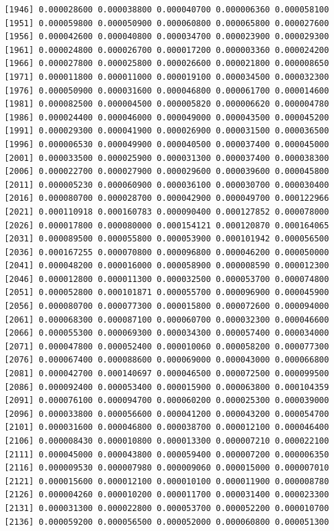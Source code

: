 \documentclass[]{article}
\begin{document}
\begin{verbatim}
 [1946] 0.000028600 0.000038800 0.000040700 0.000006360 0.000058100
 [1951] 0.000059800 0.000050900 0.000060800 0.000065800 0.000027600
 [1956] 0.000042600 0.000040800 0.000034700 0.000023900 0.000029300
 [1961] 0.000024800 0.000026700 0.000017200 0.000003360 0.000024200
 [1966] 0.000027800 0.000025800 0.000026600 0.000021800 0.000008650
 [1971] 0.000011800 0.000011000 0.000019100 0.000034500 0.000032300
 [1976] 0.000050900 0.000031600 0.000046800 0.000061700 0.000014600
 [1981] 0.000082500 0.000004500 0.000005820 0.000006620 0.000004780
 [1986] 0.000024400 0.000046000 0.000049000 0.000043500 0.000045200
 [1991] 0.000029300 0.000041900 0.000026900 0.000031500 0.000036500
 [1996] 0.000006530 0.000049900 0.000040500 0.000037400 0.000045000
 [2001] 0.000033500 0.000025900 0.000031300 0.000037400 0.000038300
 [2006] 0.000022700 0.000027900 0.000029600 0.000039600 0.000045800
 [2011] 0.000005230 0.000060900 0.000036100 0.000030700 0.000030400
 [2016] 0.000080700 0.000028700 0.000042900 0.000049700 0.000122966
 [2021] 0.000110918 0.000160783 0.000090400 0.000127852 0.000078000
 [2026] 0.000017800 0.000080000 0.000154121 0.000120870 0.000164065
 [2031] 0.000089500 0.000055800 0.000053900 0.000101942 0.000056500
 [2036] 0.000167255 0.000070800 0.000096800 0.000046200 0.000050000
 [2041] 0.000048200 0.000016000 0.000058900 0.000008590 0.000012300
 [2046] 0.000012800 0.000011300 0.000032500 0.000053700 0.000074800
 [2051] 0.000052800 0.000101871 0.000055700 0.000096900 0.000045900
 [2056] 0.000080700 0.000077300 0.000015800 0.000072600 0.000094000
 [2061] 0.000068300 0.000087100 0.000060700 0.000032300 0.000046600
 [2066] 0.000055300 0.000069300 0.000034300 0.000057400 0.000034000
 [2071] 0.000047800 0.000052400 0.000010060 0.000058200 0.000077300
 [2076] 0.000067400 0.000088600 0.000069000 0.000043000 0.000066800
 [2081] 0.000042700 0.000140697 0.000046500 0.000072500 0.000099500
 [2086] 0.000092400 0.000053400 0.000015900 0.000063800 0.000104359
 [2091] 0.000076100 0.000094700 0.000060200 0.000025300 0.000039000
 [2096] 0.000033800 0.000056600 0.000041200 0.000043200 0.000054700
 [2101] 0.000031600 0.000046800 0.000038700 0.000012100 0.000046400
 [2106] 0.000008430 0.000010800 0.000013300 0.000007210 0.000022100
 [2111] 0.000045000 0.000043800 0.000059400 0.000007200 0.000006350
 [2116] 0.000009530 0.000007980 0.000009060 0.000015000 0.000007010
 [2121] 0.000015600 0.000012100 0.000010100 0.000011900 0.000008780
 [2126] 0.000004260 0.000010200 0.000011700 0.000031400 0.000023300
 [2131] 0.000031300 0.000022800 0.000053700 0.000052200 0.000010700
 [2136] 0.000059200 0.000056500 0.000052000 0.000060800 0.000051300

\end{verbatim}
\end{document}
